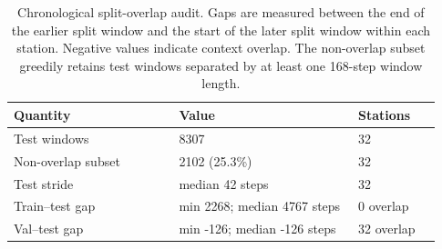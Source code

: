 \begin{table}[t]
  \centering
  \caption{Chronological split-overlap audit. Gaps are measured between the end of the earlier split window and the start of the later split window within each station. Negative values indicate context overlap. The non-overlap subset greedily retains test windows separated by at least one 168-step window length.}
  \label{tab:split-overlap-audit}
  \footnotesize
  \setlength{\tabcolsep}{3pt}
  \begin{tabular}{@{}p{0.36\linewidth}p{0.39\linewidth}p{0.18\linewidth}@{}}
    \toprule
    Quantity & Value & Stations \\
    \midrule
    Test windows & 8307 & 32 \\
    Non-overlap subset & 2102 (25.3\%) & 32 \\
    Test stride & median 42 steps & 32 \\
    Train--test gap & min 2268; median 4767 steps & 0 overlap \\
    Val--test gap & min -126; median -126 steps & 32 overlap \\
    \bottomrule
  \end{tabular}
\end{table}
